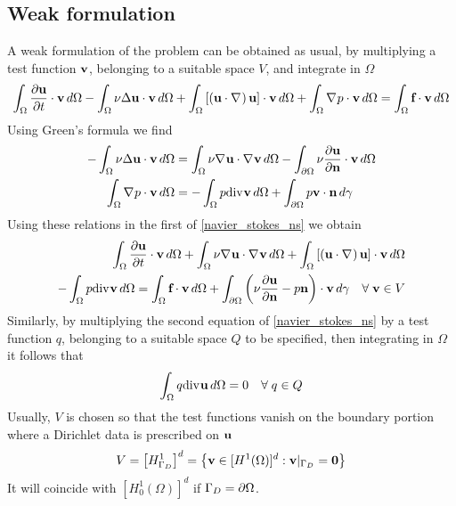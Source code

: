 \subsection{Weak formulation}
A weak formulation of the problem can be obtained as usual, by multiplying a test function \(\textbf{v}\), belonging to a suitable space \(V\), and integrate in \(\Omega\)
\begin{equation}
    \begin{split}
        \int_\Omega \partialderivative{\uvec}{t} \cdot \vvec \, d\Omega - \int_\Omega \nu \Delta \uvec \cdot \vvec \, d\Omega + \int_\Omega \left[ \left( \uvec \cdot \grad \right) \uvec \right] \cdot \vvec \, d\Omega + \int_\Omega \grad p \cdot \vvec \, d\Omega 
        = \int_\Omega \vect{f} \cdot \vvec \, d\Omega
    \end{split}
\end{equation}
Using Green's formula we find 
\begin{align*}
    -\int_\Omega \nu \Delta \uvec \cdot \vvec \, d\Omega &= \int_\Omega \nu \grad \uvec \cdot \grad \vvec \, d\Omega - \int_\boundary \nu \partialderivative{\uvec}{\normal} \cdot \vvec \, d\Omega \\
    \int_\Omega \grad p \cdot \vvec \, d\Omega &= - \int_\Omega p \div \vvec \, d\Omega + \int_\boundary p \vvec \cdot \normal \, d\gamma
\end{align*}
Using these relations in the first of \eqref{navier_stokes_ns} we obtain 
\begin{equation}
    \begin{split}
        \int_\Omega \partialderivative{\uvec}{t} \cdot \vvec \, d\Omega + \int_\Omega \nu \grad \uvec \cdot\grad \vvec \, d\Omega  + \int_\Omega \left[ \left( \uvec \cdot \grad \right) \uvec \right] \cdot \vvec \, d\Omega \\
        - \int_\Omega p\div \vvec \, d\Omega = \int_\Omega \vect{f} \cdot \vvec \, d\Omega + \int_\boundary \left( \nu \partialderivative{\uvec}{\normal} - p\normal \right) \cdot \vvec \, d\gamma \quad \forall \; \vvec \in V
    \end{split}
    \label{first_weak_formulation_ns}
\end{equation}
Similarly, by multiplying the second equation of \eqref{navier_stokes_ns} by a test function \(q\), belonging to a suitable space \(Q\) to be specified, then integrating in \(\Omega\) it follows that 
\begin{equation}
    \int_\Omega q \text{div}\mspace{1mu} \textbf{u} \, d\Omega = 0 \quad \forall \; q \in Q
    \label{weak_formulation_div_ns}
\end{equation}
Usually, \(V\) is chosen so that the test functions vanish on the boundary portion where a Dirichlet data is prescribed on \(\textbf{u}\)
\begin{equation}
    V = \left[ H^1_{\Gamma_D} \right]^d = \left\{ \textbf{v} \in [H^1(\Omega)]^d : \textbf{v}\vert_{\Gamma_D} = \textbf{0}\right\}
    \label{space_galerkin_ns}
\end{equation}
It will coincide with \(\left[ H^1_0(\Omega) \right]^d\) if \(\Gamma_D = {\partial\Omega}\). 

